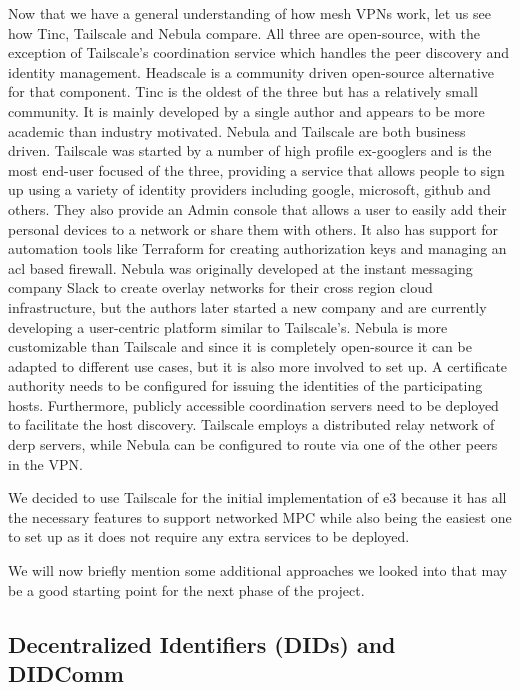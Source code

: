 Now that we have a general understanding of how mesh VPNs work, let us
see how Tinc, Tailscale and Nebula compare. All three are open-source,
with the exception of Tailscale's coordination service which handles the
peer discovery and identity management. Headscale
\autocite{fontJuanfontHeadscale2022} is a community driven open-source
alternative for that component. Tinc is the oldest of the three but has
a relatively small community. It is mainly developed by a single author
and appears to be more academic than industry motivated. Nebula and
Tailscale are both business driven. Tailscale was started by a number of
high profile ex-googlers and is the most end-user focused of the three,
providing a service that allows people to sign up using a variety of
identity providers including google, microsoft, github and others. They
also provide an Admin console that allows a user to easily add their
personal devices to a network or share them with others. It also has
support for automation tools like Terraform for creating authorization
keys and managing an \gls{acl} based firewall. Nebula was originally
developed at the instant messaging company Slack to create overlay
networks for their cross region cloud infrastructure, but the authors
later started a new company and are currently developing a user-centric
platform similar to Tailscale's. Nebula is more customizable than
Tailscale and since it is completely open-source it can be adapted to
different use cases, but it is also more involved to set up. A
certificate authority needs to be configured for issuing the identities
of the participating hosts. Furthermore, publicly accessible
coordination servers need to be deployed to facilitate the host
discovery. Tailscale employs a distributed relay network of \gls{derp}
servers, while Nebula can be configured to route via one of the other
peers in the VPN.

We decided to use Tailscale for the initial implementation of \gls{e3}
because it has all the necessary features to support networked MPC while
also being the easiest one to set up as it does not require any extra
services to be deployed.

We will now briefly mention some additional approaches we looked into
that may be a good starting point for the next phase of the project.

\hypertarget{decentralized-identifiers-dids-and-didcomm}{%
\subsection{Decentralized Identifiers (DIDs) and
DIDComm}\label{decentralized-identifiers-dids-and-didcomm}}

